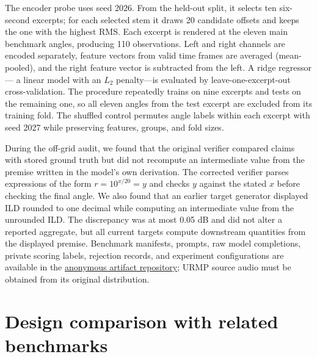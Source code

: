 \documentclass{article}
\begin{document}
The encoder probe uses seed 2026. From the held-out split, it selects ten six-second excerpts; for each selected stem it draws 20 candidate offsets and keeps the one with the highest RMS. Each excerpt is rendered at the eleven main benchmark angles, producing 110 observations. Left and right channels are encoded separately, feature vectors from valid time frames are averaged (mean-pooled), and the right feature vector is subtracted from the left. A ridge regressor---
a linear model with an \(L_2\) penalty---is evaluated by leave-one-excerpt-out cross-validation. The procedure repeatedly trains on nine excerpts and tests on the remaining one, so all eleven angles from the test excerpt are excluded from its training fold. The shuffled control permutes angle labels within each excerpt
with seed 2027 while preserving features, groups, and fold sizes.

During the off-grid audit, we found that the original verifier compared claims with stored ground truth but did not recompute an intermediate value from the premise written in the model's own derivation. The corrected verifier parses expressions of the form \(r = 10^{x/20} = y\) and checks \(y\) against the stated \(x\) before checking the final angle. We also found that an earlier target generator displayed ILD rounded to one decimal while computing an intermediate value from the unrounded ILD. The discrepancy was at most 0.05 dB and did not alter a reported aggregate, but all current targets compute downstream quantities from the displayed premise. Benchmark manifests, prompts, raw model completions, private scoring labels, rejection records, and experiment configurations are available in the \href{https://anonymous.4open.science/r/ECHO-FC6D/}{anonymous artifact repository}; URMP source audio must be obtained from its original distribution.

\section{Design comparison with related benchmarks}
\end{document}
